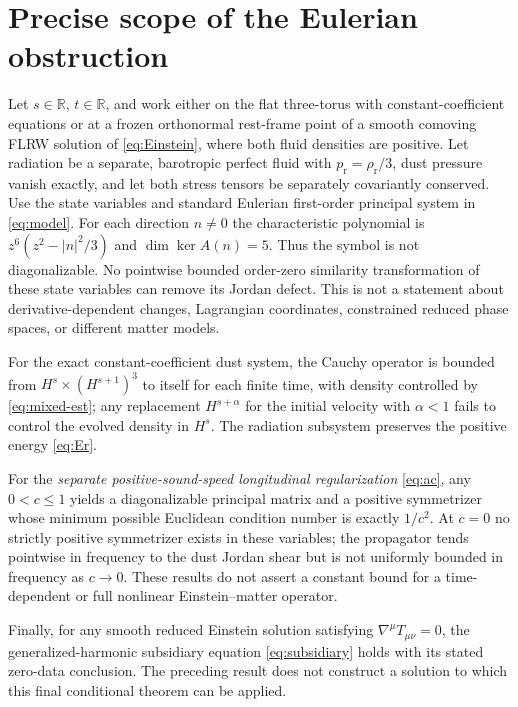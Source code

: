 \documentclass[11pt,a4paper]{article}
\newcommand{\R}{\mathbb R}
\begin{document}
\appendix
\section{Precise scope of the Eulerian obstruction}
\label{app:formulation}
Let $s\in\R$, $t\in\R$, and work
either on the flat three-torus with
constant-coefficient equations or
at a frozen orthonormal rest-frame
point of a smooth comoving FLRW
solution of \eqref{eq:Einstein},
where both fluid densities are positive.
Let radiation be a separate,
barotropic perfect fluid with
$p_{\mathrm r}=\rho_{\mathrm r}/3$,
dust pressure vanish exactly,
and let both stress tensors
be separately covariantly conserved.
Use the state variables and
standard Eulerian first-order
principal system in \eqref{eq:model}.
For each direction $n\ne0$
the characteristic polynomial is
$z^6(z^2-|n|^2/3)$ and
$\dim\ker A(n)=5$.
Thus the symbol is not diagonalizable.
No pointwise bounded
order-zero similarity transformation
of these state variables can
remove its Jordan defect.
This is not a statement about
derivative-dependent changes,
Lagrangian coordinates,
constrained reduced phase spaces,
or different matter models.

For the exact constant-coefficient
dust system, the Cauchy operator
is bounded from
$H^s\times(H^{s+1})^3$
to itself for each finite time,
with density controlled by
\eqref{eq:mixed-est}; any replacement
$H^{s+\alpha}$ for the initial
velocity with $\alpha<1$ fails to
control the evolved density in $H^s$.
The radiation subsystem preserves
the positive energy \eqref{eq:Er}.

For the \emph{separate positive-sound-speed
longitudinal regularization}
\eqref{eq:ac}, any
$0<c\le1$ yields a diagonalizable
principal matrix and a positive
symmetrizer whose minimum possible
Euclidean condition number is
exactly $1/c^2$.
At $c=0$ no strictly positive
symmetrizer exists in these
variables; the propagator tends
pointwise in frequency to
the dust Jordan shear but is
not uniformly bounded in
frequency as $c\to0$.
These results do not assert a
constant bound for a time-dependent
or full nonlinear Einstein--matter
operator.

Finally, for any smooth reduced
Einstein solution satisfying
$\nabla^\mu T_{\mu\nu}=0$,
the generalized-harmonic subsidiary
equation \eqref{eq:subsidiary}
holds with its stated zero-data
conclusion. The preceding result
does not construct a solution to
which this final conditional theorem
can be applied.
\end{document}
